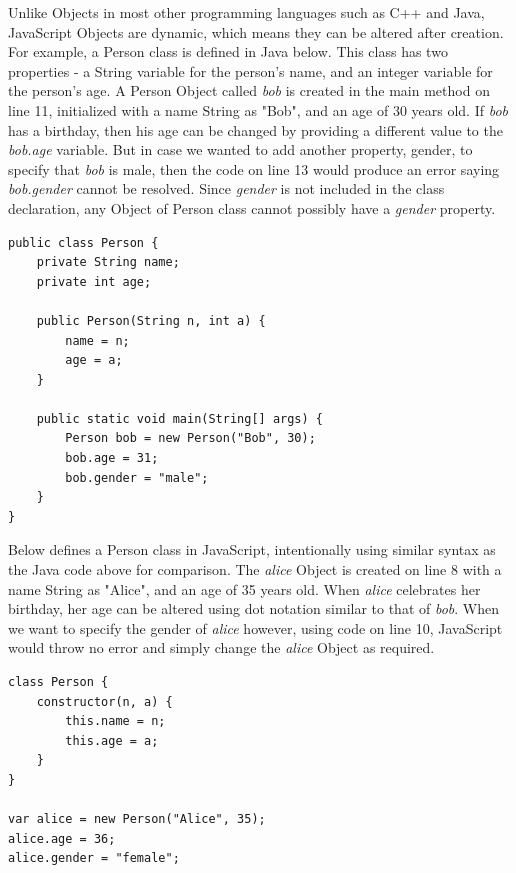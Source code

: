 \documentclass[a4paper,11pt,twoside]{report}
\begin{document}
Unlike Objects in most other programming languages such as C++ and Java, JavaScript Objects are dynamic, which means they can be altered after creation. For example, a Person class is defined in Java below. This class has two properties - a String variable for the person's name, and an integer variable for the person's age. A Person Object called \textit{bob} is created in the main method on line 11, initialized with a name String as "Bob", and an age of 30 years old. If \textit{bob} has a birthday, then his age can be changed by providing a different value to the \textit{bob.age} variable. But in case we wanted to add another property, gender, to specify that \textit{bob} is male, then the code on line 13 would produce an error saying \textit{bob.gender} cannot be resolved. Since \textit{gender} is not included in the class declaration, any Object of Person class cannot possibly have a \textit{gender} property.

\begin{adjustwidth}{4cm}{4cm}
\begin{lstlisting}
public class Person {
    private String name;
    private int age;
    
    public Person(String n, int a) {
        name = n;
        age = a;
    }
    
    public static void main(String[] args) {
        Person bob = new Person("Bob", 30);
        bob.age = 31;
        bob.gender = "male";
    }
}
\end{lstlisting}
\end{adjustwidth}

Below defines a Person class in JavaScript, intentionally using similar syntax as the Java code above for comparison. The \textit{alice} Object is created on line 8 with a name String as "Alice", and an age of 35 years old. When \textit{alice} celebrates her birthday, her age can be altered using dot notation similar to that of \textit{bob}. When we want to specify the gender of \textit{alice} however, using code on line 10, JavaScript would throw no error and simply change the \textit{alice} Object as required.
\begin{adjustwidth}{4cm}{4cm}
\begin{lstlisting}
class Person {
	constructor(n, a) {
		this.name = n;
		this.age = a;
	}
}

var alice = new Person("Alice", 35);
alice.age = 36;
alice.gender = "female";
\end{lstlisting}
\end{adjustwidth}
\end{document}
